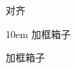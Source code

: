 \documentclass{ctexart}
\begin{document}
            {\setlength{\fboxrule}{.3em} 
            \setlength{\fboxsep}{.7em} 
            }

            {\setlength{\fboxrule}{0.1pt}
            \setlength{\fboxsep}{0pt}


            对齐
            \begin{boxedminipage}[b][3em][t]{10em}
                加框箱子

                加框箱子
            \end{boxedminipage}
            }
\end{document}
